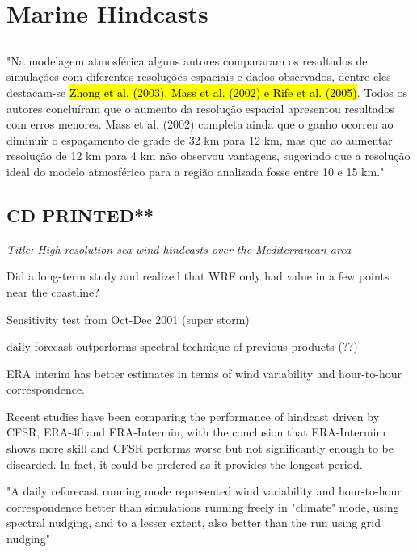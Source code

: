 \documentclass[12pt,a4paper]{article}
\begin{document}
\section{Marine Hindcasts}

\subsection{\cite{Lewis2017}}


"Na modelagem atmosférica alguns autores compararam os resultados de simulações com diferentes resoluções espaciais e dados observados, dentre eles destacam-se \hl{Zhong et al. (2003), Mass et al. (2002) e Rife et al. (2005)}. Todos os autores concluíram que o aumento da resolução espacial apresentou resultados com erros menores. Mass et al. (2002) completa ainda que o ganho ocorreu ao diminuir o espaçamento de grade de 32 km para 12 km, mas que ao aumentar resolução de 12 km para 4 km não observou vantagens, sugerindo que a resolução ideal do modelo atmosférico para a região analisada fosse entre 10 e 15 km."


\subsection{\cite{Menendez2014} CD PRINTED**}

\textit{Title: High-resolution sea wind hindcasts over the Mediterranean area}

Did a long-term study and realized that WRF only had value in a few points near the coastline?

Sensitivity test from Oct-Dec 2001 (super storm)

daily forecast outperforms spectral technique of previous products (??)

ERA interim has better estimates in terms of wind variability and hour-to-hour correspondence. 

Recent studies have been comparing the performance of hindcast driven by \gls{CFSR}, ERA-40 and ERA-Intermin, with the conclusion that ERA-Intermim shows more skill and \gls{CFSR} performs worse but not significantly enough to be discarded. In fact, it could be prefered as it provides the longest period. 

"A daily reforecast running mode represented wind variability and hour-to-hour correspondence better than simulations running freely in "climate" mode, using spectral nudging, and to a lesser extent, also better than the run using grid nudging"
\end{document}
